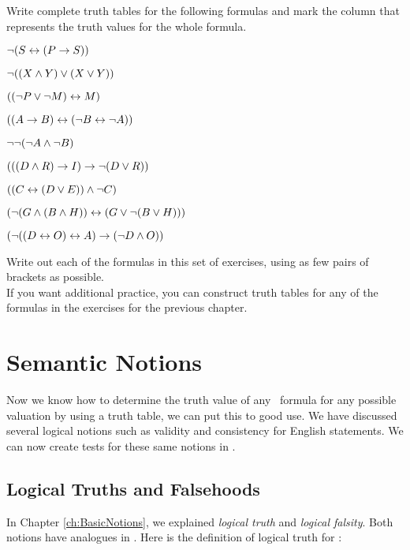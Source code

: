 \documentclass[PHIL101-Textbook.tex]{subfiles}
\begin{document}
\noindent\solutions
\problempart \label{pr.completeTT1}
Write complete truth tables for the following formulas and mark the column that represents the truth values for the whole formula.

\begin{earg}
\item $\neg (S \leftrightarrow (P \rightarrow S))$
\item $\neg ((X \land Y) \vee (X \vee Y))$
\item $((\neg P \vee \neg M) \leftrightarrow M)$
\item $((A \rightarrow B) \leftrightarrow (\neg B\leftrightarrow \neg A))$
\item $\neg \neg (\neg A \land \neg B)$
\item $(((D \land R) \rightarrow I) \rightarrow \neg(D \vee R))$
\item $((C \leftrightarrow (D \vee E)) \land \neg C)$
\item $(\neg(G \land (B \land H)) \leftrightarrow (G \vee \neg(B \vee H)))$
\item $(\neg ((D \leftrightarrow O) \leftrightarrow A) \rightarrow (\neg D \land O))$
\end{earg}

\problempart
Write out each of the formulas in this set of exercises, using as few pairs of brackets as possible.\\

\problempart 
If you want additional practice, you can construct truth tables for any of the formulas in the exercises for the previous chapter.



\chapter{Semantic Notions}
\label{ch:SemanticNotions}

Now we know how to determine the truth value of any \tfl\ formula for any possible valuation by using a truth table, we can put this to good use. We have discussed several logical notions such as validity and consistency for English statements. We can now create tests for these same notions in \tfl.


\section{Logical Truths and Falsehoods}
In Chapter \ref{ch:BasicNotions}, we explained \emph{logical truth} and \emph{logical falsity}. Both notions have analogues in \tfl. Here is the definition of logical truth for \tfl:
\end{document}
